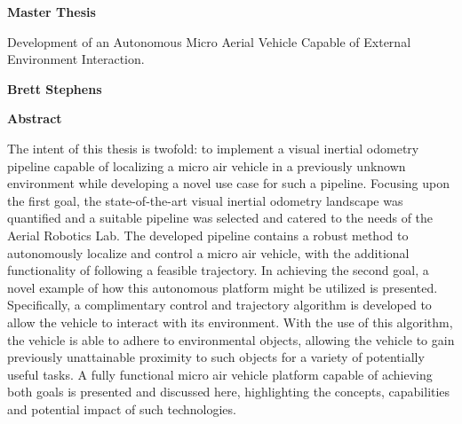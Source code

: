 \thispagestyle{plain}
\begin{center}
    \Large
    \textbf{Master Thesis}
    
    \vspace{0.4cm}
    \large
    Development of an Autonomous Micro Aerial Vehicle Capable of External Environment Interaction.
    
    \vspace{0.4cm}
    \textbf{Brett Stephens}
    
    \vspace{0.9cm}
    \textbf{Abstract}
    
\end{center}

The intent of this thesis is twofold: to implement a visual inertial odometry pipeline capable of localizing a micro air vehicle in a previously unknown environment while developing a novel use case for such a pipeline. Focusing upon the first goal, the state-of-the-art visual inertial odometry landscape was quantified and a suitable pipeline was selected and catered to the needs of the Aerial Robotics Lab. The developed pipeline contains a robust method to autonomously localize and control a micro air vehicle, with the additional functionality of following a feasible trajectory. In achieving the second goal, a novel example of how this autonomous platform might be utilized is presented. Specifically, a complimentary control and trajectory algorithm is developed to allow the vehicle to interact with its environment. With the use of this algorithm, the vehicle is able to adhere to environmental objects, allowing the vehicle to gain previously unattainable proximity to such objects for a variety of potentially useful tasks. A fully functional micro air vehicle platform capable of achieving both goals is presented and discussed here, highlighting the concepts, capabilities and potential impact of such technologies. 